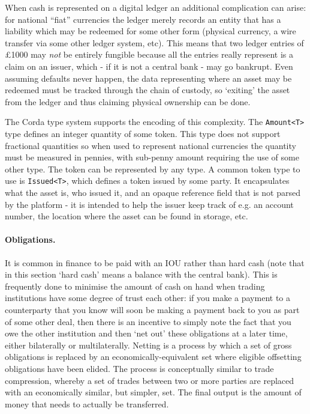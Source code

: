 \documentclass{article}
\begin{document}
When cash is represented on a digital ledger an additional complication can arise: for national ``fiat'' currencies
the ledger merely records an entity that has a liability which may be redeemed for some other form (physical currency,
a wire transfer via some other ledger system, etc). This means that two ledger entries of \pounds1000 may \emph{not}
be entirely fungible because all the entries really represent is a claim on an issuer, which - if it is not a central
bank - may go bankrupt. Even assuming defaults never happen, the data representing where an asset may be redeemed
must be tracked through the chain of custody, so `exiting' the asset from the ledger and thus claiming physical
ownership can be done.

The Corda type system supports the encoding of this complexity. The \texttt{Amount<T>} type defines an integer
quantity of some token. This type does not support fractional quantities so when used to represent national
currencies the quantity must be measured in pennies, with sub-penny amount requiring the use of some other type.
The token can be represented by any type. A common token type to use is \texttt{Issued<T>}, which defines a token
issued by some party. It encapsulates what the asset is, who issued it, and an opaque reference field that is not
parsed by the platform - it is intended to help the issuer keep track of e.g. an account number, the location where
the asset can be found in storage, etc.

\paragraph{Obligations.}It is common in finance to be paid with an IOU rather than hard cash (note that in this
section `hard cash' means a balance with the central bank). This is frequently done to minimise the amount of
cash on hand when trading institutions have some degree of trust each other: if you make a payment to a
counterparty that you know will soon be making a payment back to you as part of some other deal, then there is
an incentive to simply note the fact that you owe the other institution and then `net out' these obligations
at a later time, either bilaterally or multilaterally. Netting is a process by which a set of gross obligations
is replaced by an economically-equivalent set where eligible offsetting obligations have been elided. The process
is conceptually similar to trade compression, whereby a set of trades between two or more parties are replaced
with an economically similar, but simpler, set. The final output is the amount of money that needs to actually be
transferred.
\end{document}
